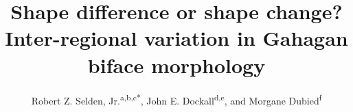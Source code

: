 \documentclass[review]{elsarticle}
\begin{document}
\begin{frontmatter}


\title{Shape difference or shape change? Inter-regional variation in Gahagan biface morphology}



\author{Robert Z. Selden, Jr.\textsuperscript{a,b,c*}, John E. Dockall\textsuperscript{d,e}, and Morgane Dubied\textsuperscript{f}}
\address[1]{Heritage Research Center, Stephen F. Austin State University, United States}
\address[2]{Cultural Heritage Department, Jean Monnet University, France}
\address[3]{ORCID ID \href{http://orcid.org/0000-0002-1789-8449}{0000-0002-1789-8449}}
\address[4]{Prewitt and Associates, Inc., United States}
\address[5]{ORCID ID \href{http://orcid.org/0000-0002-0940-7144}{0000-0002-0940-7144}}
\address[6]{UMR 6282, Laboratoire Biogéosciences, Université de Bourgogne, France}


\end{frontmatter}
\end{document}
